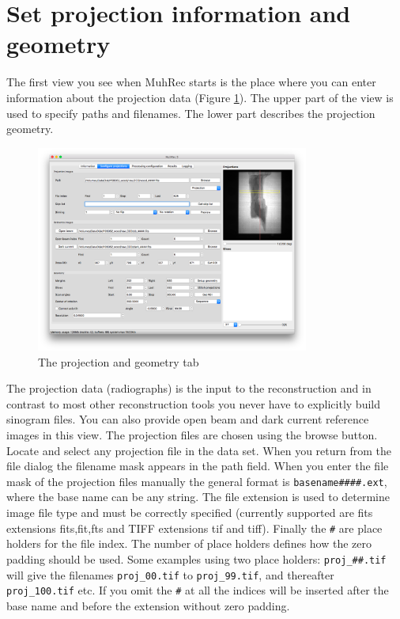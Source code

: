 \documentclass[a4paper]{scrreprt}
\begin{document}
\section{Set projection information and geometry}
The first view you see when MuhRec starts is the place where you can enter information about the projection data (Figure \ref{fig_ProjectionGeometry}). The upper part of the view is used to specify paths and filenames. The lower part describes the projection geometry.  
\begin{figure}[ht!]
\centering
 \includegraphics[width=0.8\textwidth]{figures3/Main_DataAndGeometry.png}
\caption{The projection and geometry tab}\label{fig_ProjectionGeometry}
\end{figure}

The projection data (radiographs) is the input to the reconstruction and in contrast to most other reconstruction tools you never have to explicitly build sinogram files. You can also provide open beam and dark current reference images in this view. The projection files are chosen using the browse button. Locate and select any projection file in the data set. When you return from the file dialog the filename mask appears in the path field. When you enter the file mask of the projection files manually the general format is \verb+basename####.ext+, where the base name can be any string. The file extension is used to determine image file type and must be correctly specified (currently supported are fits extensions fits,fit,fts and TIFF extensions tif and tiff). Finally the \verb+#+ are place holders for the file index. The number of place holders defines how the zero padding should be used. Some examples using two place holders: \verb+proj_##.tif+ will give the filenames \verb+proj_00.tif+ to \verb+proj_99.tif+, and thereafter \verb+proj_100.tif+ etc. If you omit the \verb+#+ at all the indices will be inserted after the base name and before the extension without zero padding.
\end{document}
